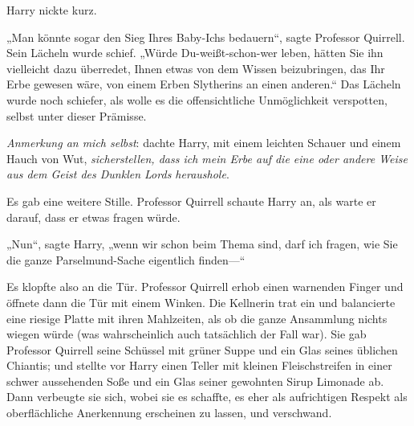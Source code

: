 Harry nickte kurz.

„Man könnte sogar den Sieg Ihres Baby-Ichs bedauern“, sagte Professor Quirrell. Sein Lächeln wurde schief. „Würde Du-weißt-schon-wer leben, hätten Sie ihn vielleicht dazu überredet, Ihnen etwas von dem Wissen beizubringen, das Ihr Erbe gewesen wäre, von einem Erben Slytherins an einen anderen.“ Das Lächeln wurde noch schiefer, als wolle es die offensichtliche Unmöglichkeit verspotten, selbst unter dieser Prämisse.

\emph{Anmerkung an mich selbst}: dachte Harry, mit einem leichten Schauer und einem Hauch von Wut, \emph{sicherstellen, dass ich mein Erbe auf die eine oder andere Weise aus dem Geist des Dunklen Lords heraushole}.

Es gab eine weitere Stille. Professor Quirrell schaute Harry an, als warte er darauf, dass er etwas fragen würde.

„Nun“, sagte Harry, „wenn wir schon beim Thema sind, darf ich fragen, wie Sie die ganze Parselmund-Sache eigentlich finden—“

Es klopfte also an die Tür. Professor Quirrell erhob einen warnenden Finger und öffnete dann die Tür mit einem Winken. Die Kellnerin trat ein und balancierte eine riesige Platte mit ihren Mahlzeiten, als ob die ganze Ansammlung nichts wiegen würde (was wahrscheinlich auch tatsächlich der Fall war). Sie gab Professor Quirrell seine Schüssel mit grüner Suppe und ein Glas seines üblichen Chiantis; und stellte vor Harry einen Teller mit kleinen Fleischstreifen in einer schwer aussehenden Soße und ein Glas seiner gewohnten Sirup Limonade ab. Dann verbeugte sie sich, wobei sie es schaffte, es eher als aufrichtigen Respekt als oberflächliche Anerkennung erscheinen zu lassen, und verschwand.

